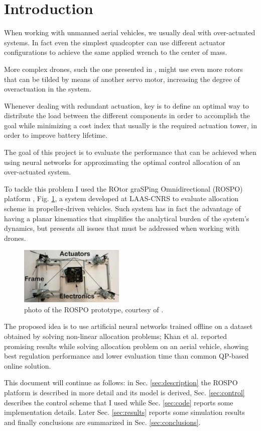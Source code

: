 \section{Introduction}
When working with unmanned aerial vehicles, we usually deal with over-actuated systems. In fact even the simplest quadcopter can use different actuator configurations to achieve the same applied wrench to the center of mass.

More complex drones, such the one presented in \cite{hexarotor}, might use even more rotors that can be tilded by means of another servo motor, increasing the degree of overactuation in the system.

Whenever dealing with redundant actuation, key is to define an optimal way to distribute the load between the different components in order to accomplish the goal while minimizing a cost index that usually is the required actuation tower, in order to improve battery lifetime.

The goal of this project is to evaluate the performance that can be achieved when using neural networks for approximating the optimal control allocation of an over-actuated system.

To tackle this problem I used the ROtor graSPing Omnidirectional (ROSPO) platform \cite{rospo}, Fig. \ref{fig:rospomech}, a system developed at LAAS-CNRS to evaluate allocation scheme in propeller-driven vehicles. Such system has in fact the advantage of having a planar kinematics that simplifies the analytical burden of the system's dynamics, but presents all issues that must be addressed when working with drones.

\begin{figure}[b]
    \centering
    \includegraphics[width=5cm]{Images/rospo-paper}
    \caption{photo of the ROSPO prototype, courtesy of \cite{rospo}.}
    \label{fig:rospomech}
\end{figure}


The proposed idea is to use artificial neural networks trained offline on a dataset obtained by solving non-linear allocation problems; Khan et al. \cite{ANNallocator} reported promising results while solving allocation problem on an aerial vehicle, showing best regulation performance and lower evaluation time than common QP-based online solution.



This document will continue as follows: in Sec. \ref{sec:description} the ROSPO platform is described in more detail and its model is derived, Sec. \ref{sec:control} describes the control scheme that I used while Sec. \ref{sec:code} reports some implementation details. Later Sec. \ref{sec:results} reports some simulation results and finally conclusions are summarized in Sec. \ref{sec:conclusions}.
